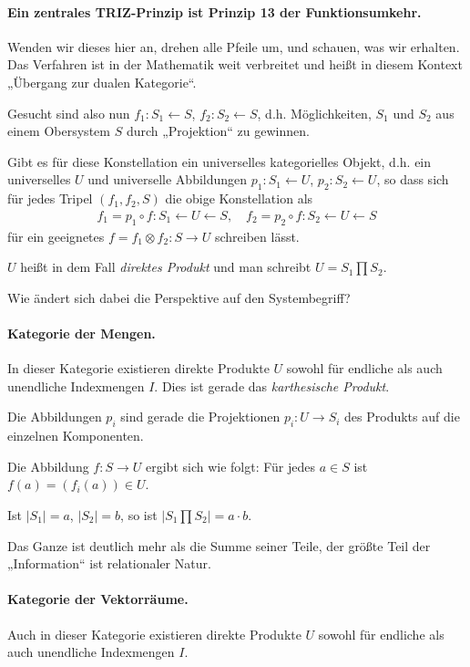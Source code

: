 \documentclass[11pt,a4paper]{article}
\begin{document}
\paragraph{Ein zentrales TRIZ-Prinzip ist Prinzip 13 der Funktionsumkehr.}
Wenden  wir dieses hier an, drehen alle Pfeile um, und schauen, was wir
erhalten. Das Verfahren ist in der Mathematik weit verbreitet und heißt in
diesem Kontext „Übergang zur dualen Kategorie“.

Gesucht sind also nun $f_1: S_1 \leftarrow S$, $f_2: S_2\leftarrow S$, d.h.
Möglichkeiten, $S_1$ und $S_2$ aus einem Obersystem $S$ durch „Projektion“ zu
gewinnen.

Gibt es für diese Konstellation ein universelles kategorielles Objekt,
d.h. ein universelles $U$ und universelle Abbildungen $p_1: S_1 \leftarrow U$,
$p_2: S_2 \leftarrow U$, so dass sich für jedes Tripel $(f_1, f_2, S)$ die
obige Konstellation als
\begin{gather*}
  f_1 = p_1 \circ f: S_1 \leftarrow U \leftarrow S,\quad f_2 = p_2 \circ f:
  S_2 \leftarrow U \leftarrow S
\end{gather*}
für ein geeignetes $f = f_1\otimes f_2: S \rightarrow U$ schreiben lässt.

$U$ heißt in dem Fall \emph{direktes Produkt} und man schreibt $U = S_1\prod
S_2$. 

Wie ändert sich dabei die Perspektive auf den Systembegriff?

\paragraph{Kategorie der Mengen.}
In dieser Kategorie existieren direkte Produkte $U$ sowohl für endliche als
auch unendliche Indexmengen $I$. Dies ist gerade das \emph{karthesische
  Produkt}.

Die Abbildungen $p_i$ sind gerade die Projektionen $p_i : U \rightarrow S_i$
des Produkts auf die einzelnen Komponenten.

Die Abbildung $f : S \rightarrow U$ ergibt sich wie folgt: Für jedes $a\in S$
ist $f(a) = (f_i(a))\in U$.

Ist $|S_1| = a$, $|S_2| = b$, so ist $|S_1\prod S_2| = a\cdot b$.

Das Ganze ist deutlich mehr als die Summe seiner Teile, der größte Teil der
„Information“ ist relationaler Natur.

\paragraph{Kategorie der Vektorräume.}
Auch in dieser Kategorie existieren direkte Produkte $U$ sowohl für endliche
als auch unendliche Indexmengen $I$.
\end{document}
